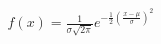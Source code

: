 \documentclass[preview]{standalone}
\begin{document}
\begin{align*}
f(x) = \frac{1}{\sigma\sqrt{2\pi}} e^{-\frac{1}{2}(\frac{x-\mu}{\sigma})^2}
\end{align*}
\end{document}
